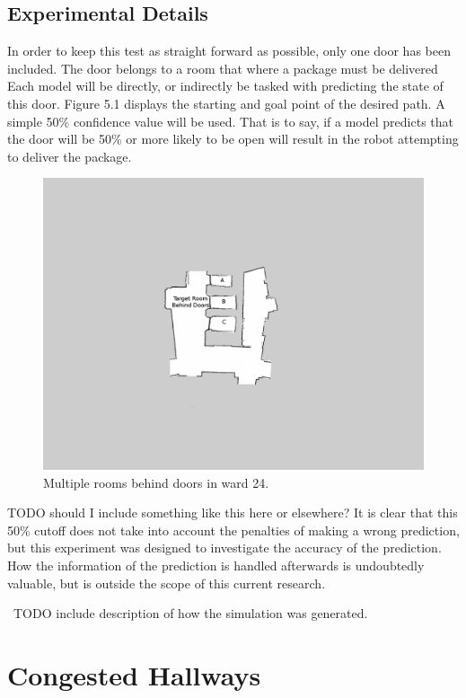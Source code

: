 \subsection{ Experimental Details }

In order to keep this test as straight forward as possible, only one door has
been included. The door belongs to a room that where a package must be
delivered Each model will be directly, or indirectly be tasked with predicting
the state of this door. Figure 5.1 displays the starting and goal point of
the desired path. A simple 50\% confidence value will be used. That is to
say, if a model predicts that the door will be 50\% or more likely to be open
will result in the robot attempting to deliver the package.


\begin{figure}[!htb]
  \centering
  \includegraphics[width=\linewidth]{images/ward_24_door.png}
  \caption{Multiple rooms behind doors in ward 24.}
  \label{figure:ward_24_door}
\end{figure}

TODO should I include something like this here or elsewhere?
It is clear that this 50\% cutoff does not take into account the penalties of
making a wrong prediction, but this experiment was designed to investigate the
accuracy of the prediction. How the information of the prediction is handled
afterwards is undoubtedly valuable, but is outside the scope of this current
research.

\
TODO include description of how the simulation was generated.


\section{ Congested Hallways }

